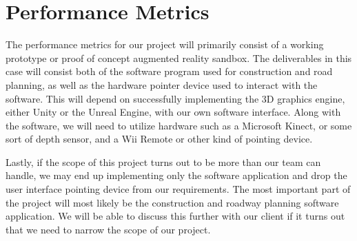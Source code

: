 \documentclass[onecolumn, draftclsnofoot,10pt, compsoc]{IEEEtran}
\begin{document}
\section{Performance Metrics}
The performance metrics for our project will primarily consist of a working prototype or proof of concept augmented reality sandbox.
The deliverables in this case will consist both of the software program used for construction and road planning, as well as the hardware pointer device used to interact with the software.
This will depend on successfully implementing the 3D graphics engine, either Unity or the Unreal Engine, with our own software interface.
Along with the software, we will need to utilize hardware such as a Microsoft Kinect, or some sort of depth sensor, and a Wii Remote or other kind of pointing device.
\par
Lastly, if the scope of this project turns out to be more than our team can handle, we may end up implementing only the software application and drop the user interface pointing device from our requirements.
The most important part of the project will most likely be the construction and roadway planning software application.
We will be able to discuss this further with our client if it turns out that we need to narrow the scope of our project.
\end{document}
